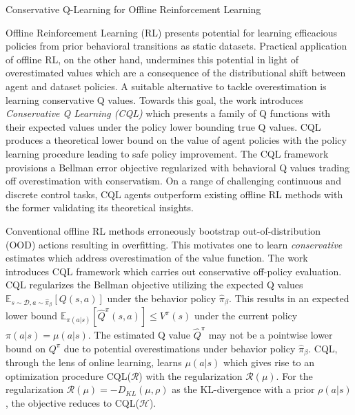 \documentclass[11pt,letterpaper]{article}
\begin{document}
\begin{center}
  \large{Conservative Q-Learning for Offline Reinforcement Learning}
\end{center}


Offline Reinforcement Learning (RL) presents potential for learning efficacious policies from prior behavioral transitions as static datasets. Practical application of offline RL, on the other hand, undermines this potential in light of overestimated values which are a consequence of the distributional shift between agent and dataset policies. A suitable alternative to tackle overestimation is learning conservative Q values. Towards this goal, the work introduces \textit{Conservative Q Learning (CQL)} which presents a family of Q functions with their expected values under the policy lower bounding true Q values. CQL produces a theoretical lower bound on the value of agent policies with the policy learning procedure leading to safe policy improvement. The CQL framework provisions a Bellman error objective regularized with behavioral Q values trading off overestimation with conservatism. On a range of challenging continuous and discrete control tasks, CQL agents outperform existing offline RL methods with the former validating its theoretical insights.

Conventional offline RL methods erroneously bootstrap out-of-distribution (OOD) actions resulting in overfitting. This motivates one to learn \textit{conservative} estimates which address overestimation of the value function. The work introduces CQL framework which carries out conservative off-policy evaluation. CQL regularizes the Bellman objective utilizing the expected Q values $\mathbb{E}_{s \sim \mathcal{D},a \sim \hat{\pi}_{\beta}}[Q(s,a)]$ under the behavior policy $\hat{\pi}_{\beta}$. This results in an expected lower bound $\mathbb{E}_{\pi(a|s)}[\hat{Q}^{\pi}(s,a)] \leq V^{\pi}(s)$ under the current policy $\pi(a|s) = \mu(a|s)$. The estimated Q value $\hat{Q}^{\pi}$ may not be a pointwise lower bound on $Q^{\pi}$ due to potential overestimations under behavior policy $\hat{\pi}_{\beta}$. CQL, through the lens of online learning, learns $\mu(a|s)$ which gives rise to an optimization procedure CQL($\mathcal{R}$) with the regularization $\mathcal{R}(\mu)$. For the regularization $\mathcal{R}(\mu) = -D_{KL}(\mu,\rho)$ as the KL-divergence with a prior $\rho(a|s)$, the objective reduces to CQL($\mathcal{H}$).
\end{document}
